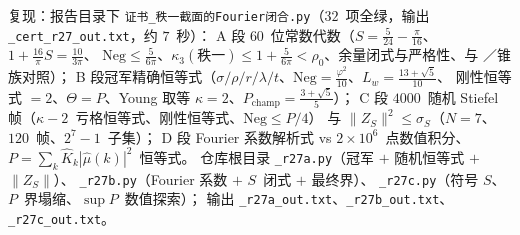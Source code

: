 复现：报告目录下 \texttt{证书\_秩一截面的Fourier闭合.py}（$32$~项全绿，输出 \texttt{\_cert\_r27\_out.txt}，约 $7$~秒）：
A 段 $60$~位常数代数（$S=\frac5{24}-\frac\pi{16}$、$1+\frac{16}\pi S=\frac{10}{3\pi}$、
$\mathrm{Neg}\le\frac5{6\pi}$、$\kappa_3(\text{秩一})\le1+\frac5{6\pi}<\rho_0$、余量闭式与严格性、与 \STW／锥族对照）；
B 段冠军精确恒等式（$\sigma/\rho/r/\lambda/t$、$\mathrm{Neg}=\frac{\varphi^2}{10}$、$L_w=\frac{13+\sqrt5}{10}$、
刚性恒等式 $=2$、$\Theta=P$、Young 取等 $\kappa=2$、$P_{\text{champ}}=\frac{3+\sqrt5}5$）；
C 段 $4000$~随机 Stiefel 帧（$\kappa-2$~亏格恒等式、刚性恒等式、$\mathrm{Neg}\le P/4$）
与 $\|Z_S\|^2\le\sigma_S$（$N=7$、$120$~帧、$2^7-1$~子集）；
D 段 Fourier 系数解析式 vs $2\times10^6$~点数值积分、$P=\sum_k\widehat K_k|\widehat\mu(k)|^2$~恒等式。
仓库根目录 \texttt{\_r27a.py}（冠军 $+$ 随机恒等式 $+$ $\|Z_S\|$）、
\texttt{\_r27b.py}（Fourier 系数 $+$ $S$~闭式 $+$ 最终界）、
\texttt{\_r27c.py}（符号 $S$、$P$~界塌缩、$\sup P$~数值探索）；
输出 \texttt{\_r27a\_out.txt}、\texttt{\_r27b\_out.txt}、\texttt{\_r27c\_out.txt}。

